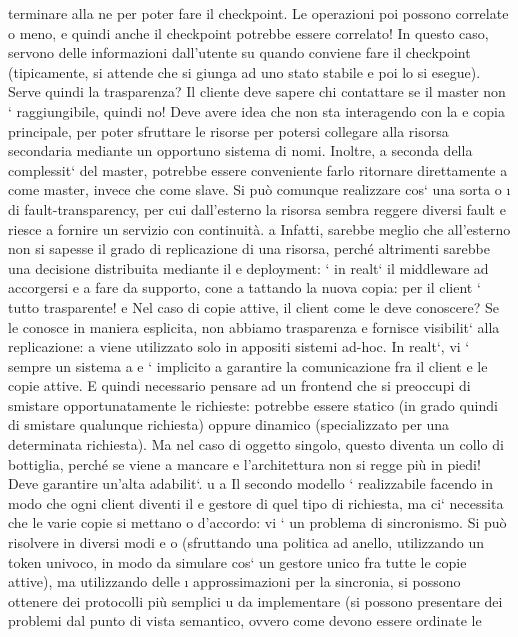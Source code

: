 \documentclass[a4paper,12pt]{article}
\begin{document}
terminare alla ne per poter fare il checkpoint.
Le operazioni poi possono correlate o meno, e quindi anche il checkpoint
potrebbe essere correlato! In questo caso, servono delle informazioni dall'utente
su quando conviene fare il checkpoint (tipicamente, si attende che si giunga ad
uno stato stabile e poi lo si esegue).
Serve quindi la trasparenza? Il cliente deve sapere chi contattare se il master
non ` raggiungibile, quindi no! Deve avere idea che non sta interagendo con la
e
copia principale, per poter sfruttare le risorse per potersi collegare alla risorsa
secondaria mediante un opportuno sistema di nomi. Inoltre, a seconda della
complessit` del master, potrebbe essere conveniente farlo ritornare direttamente
a
come master, invece che come slave. Si può comunque realizzare cos` una sorta
o
\i{}
di fault-transparency, per cui dall'esterno la risorsa sembra reggere diversi fault
e riesce a fornire un servizio con continuità.
a
Infatti, sarebbe meglio che all'esterno non si sapesse il grado di replicazione
di una risorsa, perché altrimenti sarebbe una decisione distribuita mediante il
e
deployment: ` in realt` il middleware ad accorgersi e a fare da supporto, cone
a
tattando la nuova copia: per il client ` tutto trasparente!
e
Nel caso di copie attive, il client come le deve conoscere? Se le conosce in
maniera esplicita, non abbiamo trasparenza e fornisce visibilit` alla replicazione:
a
viene utilizzato solo in appositi sistemi ad-hoc. In realt`, vi ` sempre un sistema
a
e
`
implicito a garantire la comunicazione fra il client e le copie attive. E quindi necessario pensare ad un frontend che
si preoccupi di smistare opportunatamente le
richieste: potrebbe essere statico (in grado quindi di smistare qualunque richiesta) oppure dinamico (specializzato per
una determinata richiesta). Ma nel caso
di oggetto singolo, questo diventa un collo di bottiglia, perché se viene a mancare
e
l'architettura non si regge più in piedi! Deve garantire un'alta adabilit`.
u
a
Il secondo modello ` realizzabile facendo in modo che ogni client diventi il
e
gestore di quel tipo di richiesta, ma ci` necessita che le varie copie si mettano
o
d'accordo: vi ` un problema di sincronismo. Si può risolvere in diversi modi
e
o
(sfruttando una politica ad anello, utilizzando un token univoco, in modo da
simulare cos` un gestore unico fra tutte le copie attive), ma utilizzando delle
\i{}
approssimazioni per la sincronia, si possono ottenere dei protocolli più semplici
u
da implementare (si possono presentare dei problemi dal punto di vista semantico, ovvero come devono essere ordinate le
\end{document}
